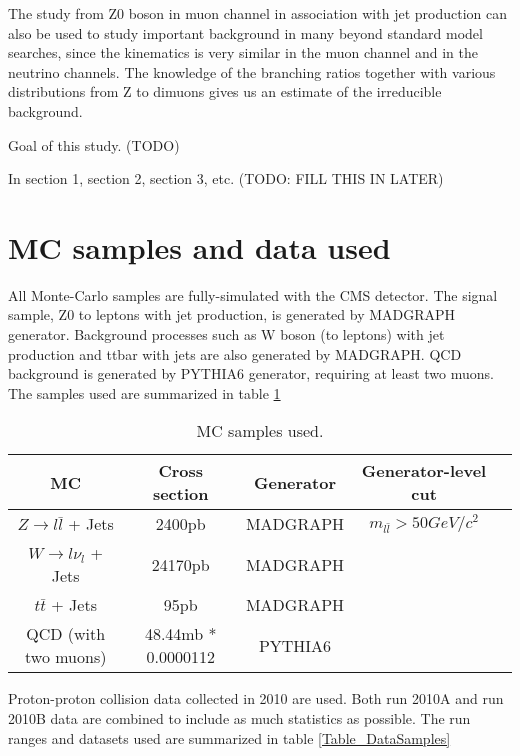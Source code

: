 \documentclass{cmspaper}
\begin{document}
The study from Z0 boson in muon channel in association with jet production can also be used to study important background in many beyond standard model searches,
since the kinematics is very similar in the muon channel and in the neutrino channels.
The knowledge of the branching ratios together with various distributions from Z to dimuons gives us an estimate of the irreducible background.

Goal of this study.  (TODO)

In section 1, section 2, section 3, etc.  (TODO: FILL THIS IN LATER)


\section{MC samples and data used}


All Monte-Carlo samples are fully-simulated with the CMS detector.
The signal sample, Z0 to leptons with jet production, is generated by MADGRAPH generator.
Background processes such as W boson (to leptons) with jet production and ttbar with jets are also generated by MADGRAPH.
QCD background is generated by PYTHIA6 generator, requiring at least two muons.
The samples used are summarized in table \ref{Table_MCSamples}

\begin{table}[htbp]
   \caption{MC samples used.}
   \centering
   \begin{tabular}{|c|c|c|c|c|}
   \hline
   MC & Cross section & Generator & Generator-level cut \\\hline
   $Z \rightarrow l\bar{l}$ + Jets & 2400pb & MADGRAPH & $m_{l\bar{l}} > 50 GeV/c^2$ \\\hline
   $W \rightarrow l\nu_l$ + Jets & 24170pb & MADGRAPH &  \\\hline
   $t\bar{t}$ + Jets & 95pb & MADGRAPH &  \\\hline
   QCD (with two muons) & 48.44mb * 0.0000112 & PYTHIA6 &  \\\hline
   \end{tabular}
   \label{Table_MCSamples}
\end{table}


Proton-proton collision data collected in 2010 are used.  Both run 2010A and run 2010B data are combined to include as much statistics as possible.
The run ranges and datasets used are summarized in table \ref{Table_DataSamples}
\end{document}
